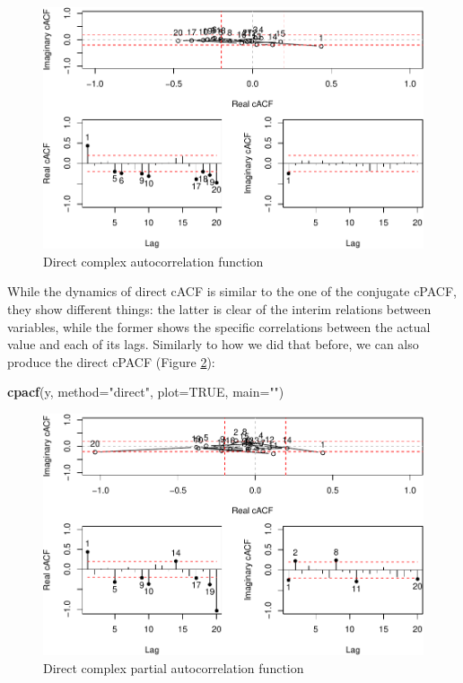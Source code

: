 \documentclass[
]{book}
\newenvironment{Shaded}{\begin{snugshade}}{\end{snugshade}}
\newcommand{\DataTypeTok}[1]{\textcolor[rgb]{0.13,0.29,0.53}{#1}}
\newcommand{\KeywordTok}[1]{\textcolor[rgb]{0.13,0.29,0.53}{\textbf{#1}}}
\newcommand{\NormalTok}[1]{#1}
\newcommand{\OtherTok}[1]{\textcolor[rgb]{0.56,0.35,0.01}{#1}}
\newcommand{\StringTok}[1]{\textcolor[rgb]{0.31,0.60,0.02}{#1}}
\begin{document}
\begin{figure}
\centering
\includegraphics{Svetunkov---Svetunkov---Complex-Valued-Econometrics_files/figure-latex/complexAR1ACFDir-1.pdf}
\caption{\label{fig:complexAR1ACFDir}Direct complex autocorrelation function}
\end{figure}

While the dynamics of direct cACF is similar to the one of the conjugate cPACF, they show different things: the latter is clear of the interim relations between variables, while the former shows the specific correlations between the actual value and each of its lags. Similarly to how we did that before, we can also produce the direct cPACF (Figure \ref{fig:complexAR1PACFDir}):

\begin{Shaded}
\begin{Highlighting}[]
\KeywordTok{cpacf}\NormalTok{(y, }\DataTypeTok{method=}\StringTok{"direct"}\NormalTok{, }\DataTypeTok{plot=}\OtherTok{TRUE}\NormalTok{, }\DataTypeTok{main=}\StringTok{""}\NormalTok{)}
\end{Highlighting}
\end{Shaded}

\begin{figure}
\centering
\includegraphics{Svetunkov---Svetunkov---Complex-Valued-Econometrics_files/figure-latex/complexAR1PACFDir-1.pdf}
\caption{\label{fig:complexAR1PACFDir}Direct complex partial autocorrelation function}
\end{figure}
\end{document}
